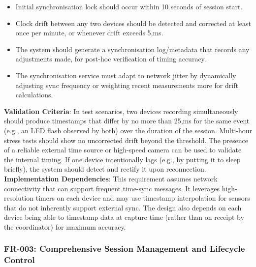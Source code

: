\documentclass[11pt,a4paper]{report}
\begin{document}
\begin{itemize}
\item Initial synchronisation lock should occur within 10 seconds of session start.
\item Clock drift between any two devices should be detected and corrected at least once per minute, or whenever drift exceeds 5,ms.
\item The system should generate a synchronisation log/metadata that records any adjustments made, for post-hoc verification of timing accuracy.
\item The synchronisation service must adapt to network jitter by dynamically adjusting sync frequency or weighting recent measurements more for drift calculations.
\end{itemize} \textbf{Validation Criteria}: In test scenarios, two devices recording simultaneously should produce timestamps that differ by no more than 25,ms for the same event (e.g., an LED flash observed by both) over the duration of the session. Multi-hour stress tests should show no uncorrected drift beyond the threshold. The presence of a reliable external time source or high-speed camera can be used to validate the internal timing. If one device intentionally lags (e.g., by putting it to sleep briefly), the system should detect and rectify it upon reconnection. \textbf{Implementation Dependencies}: This requirement assumes network connectivity that can support frequent time-sync messages. It leverages high-resolution timers on each device and may use timestamp interpolation for sensors that do not inherently support external sync. The design also depends on each device being able to timestamp data at capture time (rather than on receipt by the coordinator) for maximum accuracy. \subsubsection*{FR-003: Comprehensive Session Management and Lifecycle Control}
\end{document}
